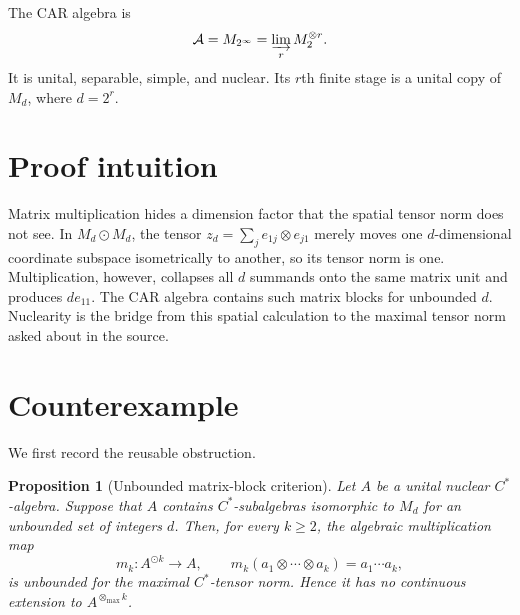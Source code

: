 \documentclass[11pt]{article}
\newtheorem{proposition}{Proposition}
\newcommand{\A}{\mathcal A}
\newcommand{\M}{M}
\newcommand{\od}{\mathbin{\odot}}
\newcommand{\tmax}{\otimes_{\max}}
\begin{document}
The CAR algebra is
\[
 \A=\M_{2^\infty}
   =\varinjlim_r \M_2^{\otimes r}.
\]
It is unital, separable, simple, and nuclear.  Its $r$th finite stage is a
unital copy of $\M_d$, where $d=2^r$.

\section{Proof intuition}

Matrix multiplication hides a dimension factor that the spatial tensor norm
does not see.  In $\M_d\od\M_d$, the tensor
$z_d=\sum_j e_{1j}\otimes e_{j1}$ merely moves one $d$-dimensional coordinate
subspace isometrically to another, so its tensor norm is one.  Multiplication,
however, collapses all $d$ summands onto the same matrix unit and produces
$d e_{11}$.  The CAR algebra contains such matrix blocks for unbounded $d$.
Nuclearity is the bridge from this spatial calculation to the maximal tensor
norm asked about in the source.

\section{Counterexample}

We first record the reusable obstruction.

\begin{proposition}[Unbounded matrix-block criterion]\label{prop:criterion}
Let $A$ be a unital nuclear $C^*$-algebra.  Suppose that $A$ contains
$C^*$-subalgebras isomorphic to $\M_d$ for an unbounded set of integers $d$.
Then, for every $k\geq2$, the algebraic multiplication map
\[
 m_k:A^{\od k}\longrightarrow A,
 \qquad
 m_k(a_1\otimes\cdots\otimes a_k)=a_1\cdots a_k,
\]
is unbounded for the maximal $C^*$-tensor norm.  Hence it has no continuous
extension to $A^{\tmax k}$.
\end{proposition}
\end{document}
